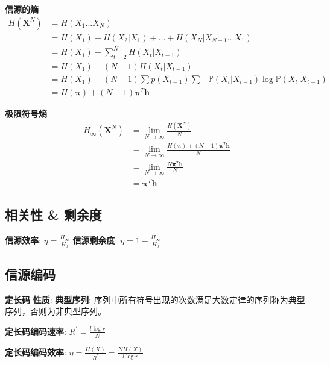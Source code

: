 \documentclass{article}
\begin{document}
            \textbf{信源的熵}
            \begin{align*}
                H(\boldsymbol X^N) &= H(X_1 ... X_N)\\
                &= H(X_1) + H(X_2|X_1) + ... + H(X_N | X_{N-1} ... X_{1}) \tag{条件熵展开}\\
                &= H(X_1) + \sum\limits_{t=2}^N H(X_t | X_{t-1}) \tag{Markov性}\\
                &= H(X_1) + (N-1) H(X_t | X_{t-1}) \tag{平稳性}\\
                &= H(X_1) + (N-1) \sum p(X_{t-1}) \sum - \mathbb P(X_t | X_{t-1}) \log \mathbb P(X_t | X_{t-1}) \tag{条件熵代入}\\
                &= H(\boldsymbol \pi) + (N-1)  \boldsymbol \pi^T \boldsymbol h \tag{平稳分布$\boldsymbol \pi$代入}
            \end{align*}
            
            \textbf{极限符号熵}
            \begin{align*}
                H_\infty(\boldsymbol X^N) &= \lim\limits_{N \to \infty}\frac{H(\boldsymbol X^N)}{N} \tag{定义}\\
                &= \lim\limits_{N \to \infty} \frac{H(\boldsymbol \pi) + (N-1)  \boldsymbol \pi^T \boldsymbol h}{N} \tag{代入}\\
                &= \lim\limits_{N \to \infty} \frac{N \boldsymbol \pi^T \boldsymbol h}{N} \tag{省略$\to 0$量}\\
                &= \boldsymbol \pi^T \boldsymbol h
            \end{align*}

    \subsection{相关性 \& 剩余度}
        \textbf{信源效率}: $\eta = \frac{H_\infty}{H_0}$
        \textbf{信源剩余度}: $\eta = 1 - \frac{H_\infty}{H_0}$
            
    \subsection{信源编码}
        \textbf{定长码}
            \textbf{性质}:
                \textbf{典型序列}: 序列中所有符号出现的次数满足大数定律的序列称为典型序列，否则为非典型序列。

                \textbf{定长码编码速率}: $R^{\prime}=\frac{l \log r}{N}$

                \textbf{定长码编码效率}: $\eta=\frac{H(X)}{R^{\prime}}=\frac{N H(X)}{l \log r}$
                
\end{document}

